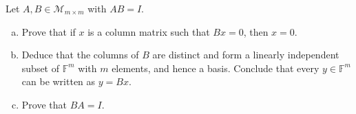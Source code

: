 \begin{exercise}
  \label{ex:hw02:one-sided-inverses}
  Let \(A,B\in\mathcal M_{m\times m}\) with \(AB=I\).
  \begin{enumerate}[(a)][2]
    \item Prove that if \(x\) is a column matrix such that \(Bx=0\),
      then \(x=0\).
    \item Deduce that the columns of \(B\) are distinct and form a
      linearly independent subset of \(\mathbb F^m\) with \(m\)
      elements, and hence a basis. Conclude that every \(y\in\mathbb F^m\)
      can be written as \(y=Bx\).
    \item Prove that \(BA=I\).
  \end{enumerate}
\end{exercise}
